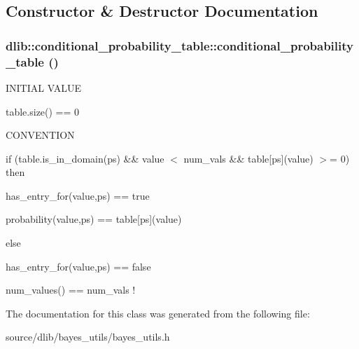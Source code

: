 \subsection{Constructor \& Destructor Documentation}
\hypertarget{classdlib_1_1conditional__probability__table_a0b0989c283746263c7f339f10da7b59e}{
\subsubsection[{conditional\_\-probability\_\-table}]{\setlength{\rightskip}{0pt plus 5cm}dlib::conditional\_\-probability\_\-table::conditional\_\-probability\_\-table ()}}
\label{classdlib_1_1conditional__probability__table_a0b0989c283746263c7f339f10da7b59e}
INITIAL VALUE
\begin{DoxyItemize}
\item table.size() == 0
\end{DoxyItemize}

CONVENTION
\begin{DoxyItemize}
\item if (table.is\_\-in\_\-domain(ps) \&\& value $<$ num\_\-vals \&\& table\mbox{[}ps\mbox{]}(value) $>$= 0) then
\begin{DoxyItemize}
\item has\_\-entry\_\-for(value,ps) == true
\item probability(value,ps) == table\mbox{[}ps\mbox{]}(value)
\end{DoxyItemize}
\item else
\begin{DoxyItemize}
\item has\_\-entry\_\-for(value,ps) == false
\end{DoxyItemize}
\end{DoxyItemize}


\begin{DoxyItemize}
\item num\_\-values() == num\_\-vals ! 
\end{DoxyItemize}

The documentation for this class was generated from the following file:\begin{DoxyCompactItemize}
\item 
source/dlib/bayes\_\-utils/bayes\_\-utils.h\end{DoxyCompactItemize}
